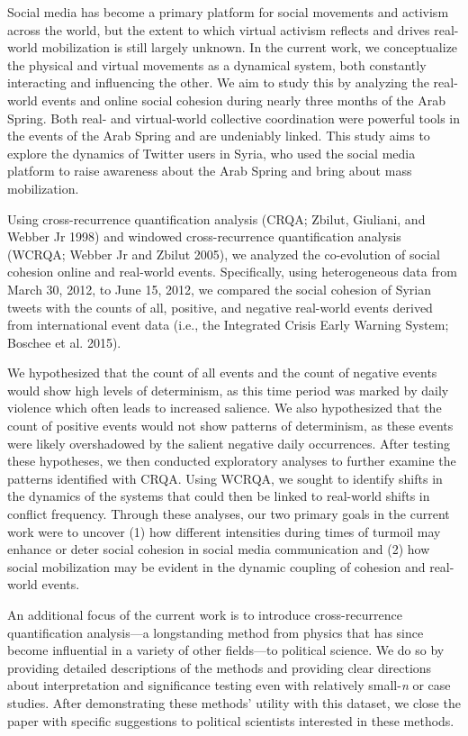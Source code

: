 \documentclass[
  english,
  man]{apa6}
\begin{document}
Social media has become a primary platform for social movements and activism
across the world, but the extent to which virtual activism reflects and drives
real-world mobilization is still largely unknown. In the current work, we
conceptualize the physical and virtual movements as a dynamical system, both
constantly interacting and influencing the other. We aim to study this by
analyzing the real-world events and online social cohesion during nearly three
months of the Arab Spring. Both real- and virtual-world collective coordination
were powerful tools in the events of the Arab Spring and are undeniably linked.
This study aims to explore the dynamics of Twitter users in Syria, who used the
social media platform to raise awareness about the Arab Spring and bring about
mass mobilization.

Using cross-recurrence quantification analysis (CRQA; Zbilut, Giuliani, and Webber Jr 1998) and
windowed cross-recurrence quantification analysis (WCRQA; Webber Jr and Zbilut 2005), we analyzed the co-evolution of social cohesion online
and real-world events. Specifically, using heterogeneous data from March 30,
2012, to June 15, 2012, we compared the social cohesion of Syrian tweets with
the counts of all, positive, and negative real-world events derived from
international event data (i.e., the Integrated Crisis Early Warning System; Boschee et al. 2015).

We hypothesized that the count of all events and the count of negative events
would show high levels of determinism, as this time period was marked by daily
violence which often leads to increased salience. We also hypothesized that the
count of positive events would not show patterns of determinism, as these events
were likely overshadowed by the salient negative daily occurrences. After
testing these hypotheses, we then conducted exploratory analyses to further
examine the patterns identified with CRQA. Using WCRQA, we sought to identify
shifts in the dynamics of the systems that could then be linked to real-world
shifts in conflict frequency. Through these analyses, our two primary goals in
the current work were to uncover (1) how different intensities during times of
turmoil may enhance or deter social cohesion in social media communication and
(2) how social mobilization may be evident in the dynamic coupling of cohesion
and real-world events.

An additional focus of the current work is to introduce cross-recurrence
quantification analysis---a longstanding method from physics that has since
become influential in a variety of other fields---to political science. We do so
by providing detailed descriptions of the methods and providing clear directions
about interpretation and significance testing even with relatively small-\emph{n} or
case studies. After demonstrating these methods' utility with this dataset, we
close the paper with specific suggestions to political scientists interested in
these methods.
\end{document}
